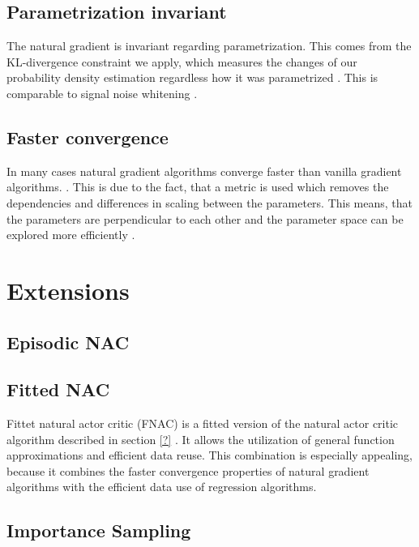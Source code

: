 \subsection{Parametrization invariant}
The natural gradient is invariant regarding parametrization. This comes from the KL-divergence constraint we apply, which measures the changes of our probability density estimation regardless how it was parametrized \cite{pascanu2013revisiting}. This is comparable to signal noise whitening \cite{sohl2012natural}.

\subsection{Faster convergence}
In many cases natural gradient algorithms converge faster than vanilla gradient algorithms. \cite{sohl2012natural, ??, ??}. This is due to the fact, that a metric is used which removes the dependencies and differences in scaling between the parameters. This means, that the parameters are perpendicular to each other and the parameter space can be explored more efficiently \cite{sohl2012natural}.

\newpage
\section{Extensions}

\subsection{Episodic NAC}

\subsection{Fitted NAC}

Fittet natural actor critic (FNAC) is a fitted version of the natural actor critic algorithm described in section \ref{?} \cite{melo2008fitted}.  It allows the utilization of general function approximations and efficient data reuse. This combination is especially appealing, because it combines the faster convergence properties of natural gradient algorithms with the efficient data use of regression algorithms.

\subsection{Importance Sampling}

